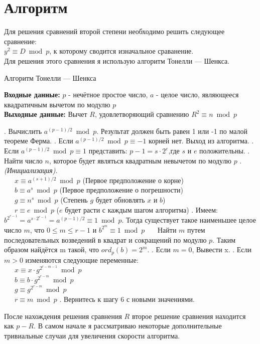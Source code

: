\documentclass[11pt]{article}
\begin{document}
	\section{Алгоритм}
	Для решения сравнений второй степени необходимо решить следующее сравнение:\\
	$y^2\equiv D\bmod p$, к которому сводится изначальное сраванение.\\
	Для решения этого сравнения я использую алгоритм Тонелли — Шенкса.
	\newpage
	\begin{algorithm}[ph]
		\caption{Алгоритм Тонелли — Шенкса}
		\label{alg:AlgName}
		\textbf{Входные данные:} $p$ - нечётное простое число, $a$ - целое число, являющееся квадратичным вычетом по модулю $p$\\
		\textbf{Выходные данные:} Вычет $R$, удовлетворяющий сравнению $R^2\equiv n\bmod p$
		\begin{algorithmic}
			. Вычислить $a^{(p-1)/2}\bmod p$. Результат должен быть равен 1 или -1 по малой теореме Ферма.
			. Если $a^{(p-1)/2}\bmod p \equiv -1$ корней нет. Выход из алгоритма.
			. Если $a^{(p-1)/2}\bmod p \equiv 1$ представить: $p-1=s\cdot 2^e$,где $s$ и $e$ положительны.
			. Найти число $n$, которое будет являться квадратным невычетом по модулю $p$
			. \textit{(Инициализация)}.\\ 
			\ \ \ $x\equiv a^{(s+1)/2}\bmod p$ (Первое предположение о корне)\\
			\ \ \ $b\equiv a^s\bmod p$ (Первое предположение о погрешности)\\
			\ \ \ $g\equiv n^s\bmod p$ (Степень $g$ будет обновлять $x$ и $b$)\\
		    \ \ \ $r\equiv e\bmod p$ ($e$ будет расти с каждым шагом алгоритма)
			. Имеем: $b^{2^{r-1}}=a^{s\cdot 2^{r-1}}=a^{(p-1)/2}\equiv 1\bmod p$. Тогда существует такое наименьшее целое число $m$, что $0\le m\le r-1$ и $b^{2^m}\equiv1\bmod p$
			\ \ \ Найти $m$ путем последовательных возведений в квадрат и сокращений по модулю $p$. Таким образом найдётся m такой, что $ord_p(b)=2^m$.
			. Если $m=0$, Вывести x.
			. Если $m>0$ изменяются следующие переменные: \\
			\ \ \ $x\equiv x\cdot g^{2^{r-m-1}}\bmod p$ \\
			\ \ \ $b\equiv b\cdot g^{2^{r-m}}\bmod p$ \\
			\ \ \ $g\equiv g^{2^{r-m}}\bmod p$ \\
			\ \ \ $r\equiv m\bmod p$
			. Вернитесь к шагу 6 с новыми значениями.
		\end{algorithmic}
	\end{algorithm}
	После нахождения решения сравнения $R$ второе решение сравнения находится как $p-R$. В самом начале я рассматриваю некоторые дополнительные тривиальные случаи для увеличения скорости алгоритма.
\end{document}
